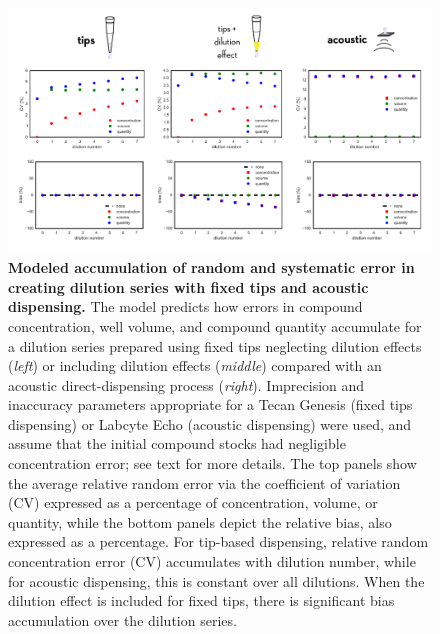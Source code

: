 \documentclass[aps,pre,twocolumn,nofootinbib,superscriptaddress,linenumbers]{revtex4-1}
\begin{document}
\begin{figure}[tb]
    \includegraphics[width=1.0\textwidth]{../figures/volumes-n-concentrations.pdf}

  \caption{{\bf Modeled accumulation of random and systematic error in creating dilution series with fixed tips and acoustic dispensing.}
  The model predicts how errors in compound concentration, well volume, and compound quantity accumulate for a dilution series prepared using fixed tips neglecting dilution effects (\emph{left}) or including dilution effects (\emph{middle}) compared with an acoustic direct-dispensing process (\emph{right}).
  Imprecision and inaccuracy parameters appropriate for a Tecan Genesis (fixed tips dispensing) or Labcyte Echo (acoustic dispensing) were used, and assume that the initial compound stocks had negligible concentration error; see text for more details.
  The top panels show the average relative random error via the coefficient of variation (CV) expressed as a percentage of concentration, volume, or quantity, while the bottom panels depict the relative bias, also expressed as a percentage.
  For tip-based dispensing, relative random concentration error (CV) accumulates with dilution number, while for acoustic dispensing, this is constant over all dilutions.
  When the dilution effect is included for fixed tips, there is significant bias accumulation over the dilution series.
  }
  \label{fig:volumes-n-concentrations}
\end{figure}
\end{document}
